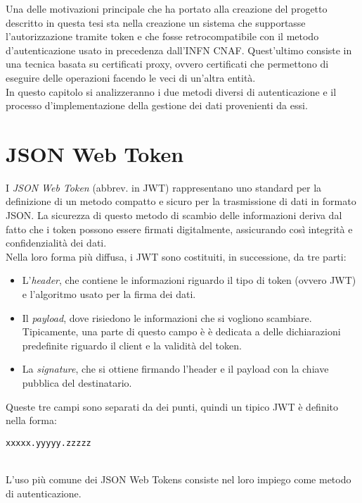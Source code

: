 Una delle motivazioni principale che ha portato alla creazione del progetto descritto in questa tesi 
sta nella creazione un sistema che supportasse 
l'autorizzazione tramite token e che fosse retrocompatibile con il metodo d'autenticazione usato in precedenza dall'INFN CNAF.  
Quest'ultimo consiste in una tecnica basata su certificati proxy, ovvero certificati che permettono di eseguire delle operazioni facendo le veci di un'altra entità. 
\\ In questo capitolo si analizzeranno i due metodi diversi di autenticazione e il processo d'implementazione della gestione 
dei dati provenienti da essi.

\section{JSON Web Token}
I \textit{JSON Web Token} (abbrev. in JWT) rappresentano uno standard per la definizione di un metodo 
compatto e sicuro per la trasmissione di dati in formato JSON. La sicurezza di questo metodo di scambio delle 
informazioni deriva dal fatto che i token possono essere firmati digitalmente, assicurando così integrità e confidenzialità dei dati.  
\\ Nella loro forma più diffusa, i JWT sono costituiti, in successione, da tre parti:
\begin{itemize}
    \item L'\textit{header}, che contiene le informazioni riguardo il tipo di token (ovvero JWT) e 
    l'algoritmo usato per la firma dei dati. 
    \item Il \textit{payload}, dove risiedono le informazioni che si vogliono scambiare. Tipicamente, una parte di questo campo è 
    è dedicata a delle dichiarazioni predefinite riguardo il client e la validità del token. 
    \item La \textit{signature}, che si ottiene firmando l'header e il payload con la chiave pubblica del destinatario.
\end{itemize}
Queste tre campi sono separati da dei punti, quindi un tipico JWT è definito nella forma:
\\ \centerline{\texttt{xxxxx.yyyyy.zzzzz}}
\\ L'uso più comune dei JSON Web Tokens consiste nel loro impiego come metodo di autenticazione.

